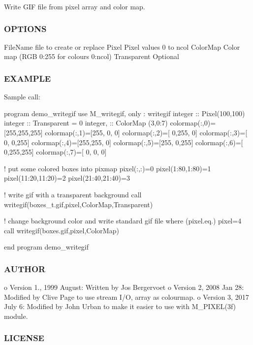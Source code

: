 Write G\+IF file from pixel array and color map.

\subsubsection*{O\+P\+T\+I\+O\+NS}

File\+Name file to create or replace Pixel Pixel values 0 to ncol Color\+Map Color map (R\+GB 0\+:255 for colours 0\+:ncol) Transparent Optional \subsubsection*{E\+X\+A\+M\+P\+LE}

Sample call\+:

program demo\+\_\+writegif use M\+\_\+writegif, only \+: writegif integer \+:\+: Pixel(100,100) integer \+:\+: Transparent = 0 integer, \+:\+: Color\+Map (3,0\+:7) colormap(\+:,0)=\mbox{[}255,255,255\mbox{]} colormap(\+:,1)=\mbox{[}255, 0, 0\mbox{]} colormap(\+:,2)=\mbox{[} 0,255, 0\mbox{]} colormap(\+:,3)=\mbox{[} 0, 0,255\mbox{]} colormap(\+:,4)=\mbox{[}255,255, 0\mbox{]} colormap(\+:,5)=\mbox{[}255, 0,255\mbox{]} colormap(\+:,6)=\mbox{[} 0,255,255\mbox{]} colormap(\+:,7)=\mbox{[} 0, 0, 0\mbox{]}

! put some colored boxes into pixmap pixel(\+:,\+:)=0 pixel(1\+:80,1\+:80)=1 pixel(11\+:20,11\+:20)=2 pixel(21\+:40,21\+:40)=3

! write gif with a transparent background call writegif(\textquotesingle{}boxes\+\_\+t.\+gif\textquotesingle{},pixel,Color\+Map,Transparent)

! change background color and write standard gif file where (pixel.\+eq.) pixel=4 call writegif(\textquotesingle{}boxes.\+gif\textquotesingle{},pixel,Color\+Map)

end program demo\+\_\+writegif

\subsubsection*{A\+U\+T\+H\+OR}

o Version 1., 1999 August\+: Written by Jos Bergervoet o Version 2, 2008 Jan 28\+: Modified by Clive Page to use stream I/O, array as colourmap. o Version 3, 2017 July 6\+: Modified by John Urban to make it easier to use with M\+\_\+\+P\+I\+X\+E\+L(3f) module. \subsubsection*{L\+I\+C\+E\+N\+SE}

